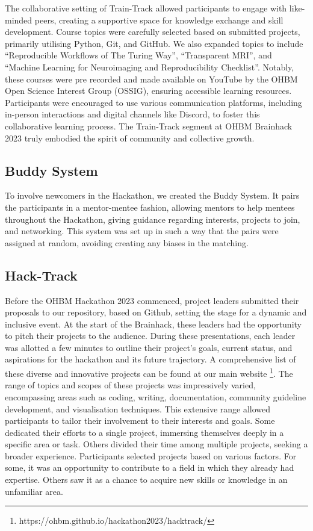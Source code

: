 \documentclass{article}
\begin{document}
The collaborative setting of Train-Track allowed participants to engage with like-minded peers, creating a supportive space for knowledge exchange and skill development.
Course topics were carefully selected based on submitted projects, primarily utilising Python, Git, and GitHub.
We also expanded topics to include “Reproducible Workflows of The Turing Way”, “Transparent MRI”, and “Machine Learning for Neuroimaging and Reproducibility Checklist”.
Notably, these courses were pre recorded and made available on YouTube by the OHBM Open Science Interest Group (OSSIG), ensuring accessible learning resources.
Participants were encouraged to use various communication platforms, including in-person interactions and digital channels like Discord, to foster this collaborative learning process.
The Train-Track segment at OHBM Brainhack 2023 truly embodied the spirit of community and collective growth.


\subsection{Buddy System}

To involve newcomers in the Hackathon, we created the Buddy System.
It pairs the participants in a mentor-mentee fashion, allowing mentors to help mentees throughout the Hackathon, giving guidance regarding interests, projects to join, and networking.
This system was set up in such a way that the pairs were assigned at random, avoiding creating any biases in the matching.

\subsection{Hack-Track}

Before the OHBM Hackathon 2023 commenced, project leaders submitted their proposals to our repository, based on Github, setting the stage for a dynamic and inclusive event.
At the start of the Brainhack, these leaders had the opportunity to pitch their projects to the audience.
During these presentations, each leader was allotted a few minutes to outline their project's goals, current status, and aspirations for the hackathon and its future trajectory.
A comprehensive list of these diverse and innovative projects can be found at our main website \footnote{https://ohbm.github.io/hackathon2023/hacktrack/}.
The range of topics and scopes of these projects was impressively varied, encompassing areas such as coding, writing, documentation, community guideline development, and visualisation techniques.
This extensive range allowed participants to tailor their involvement to their interests and goals.
Some dedicated their efforts to a single project, immersing themselves deeply in a specific area or task.
Others divided their time among multiple projects, seeking a broader experience.
Participants selected projects based on various factors.
For some, it was an opportunity to contribute to a field in which they already had expertise.
Others saw it as a chance to acquire new skills or knowledge in an unfamiliar area.
\end{document}
